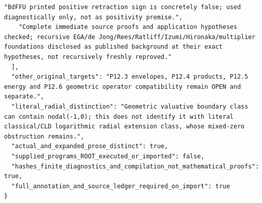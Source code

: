 \documentclass[11pt]{article}
\begin{document}
\begin{Verbatim}[breaklines=true,fontsize=\footnotesize]
    "BdFFU printed positive retraction sign is concretely false; used diagnostically only, not as positivity premise.",
    "Complete immediate source proofs and application hypotheses checked; recursive EGA/de Jong/Rees/Ratliff/Izumi/Hironaka/multiplier foundations disclosed as published background at their exact hypotheses, not recursively freshly reproved."
  ],
  "other_original_targets": "P12.3 envelopes, P12.4 products, P12.5 energy and P12.6 geometric operator compatibility remain OPEN and separate.",
  "literal_radial_distinction": "Geometric valuative boundary class can contain nodal(-1,0); this does not identify it with literal classical/CLD logarithmic radial extension class, whose mixed-zero obstruction remains.",
  "actual_and_expanded_prose_distinct": true,
  "supplied_programs_ROOT_executed_or_imported": false,
  "hashes_finite_diagnostics_and_compilation_not_mathematical_proofs": true,
  "full_annotation_and_source_ledger_required_on_import": true
}
\end{Verbatim}
\end{document}
